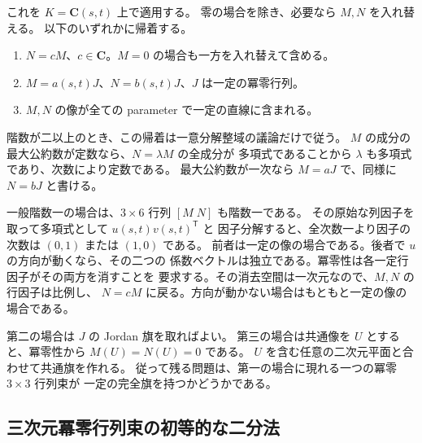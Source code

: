 \documentclass[11pt,a4paper]{ltjsarticle}
\theoremstyle{remark}\newtheorem{remark}[theorem]{注意}
\begin{document}
これを $K=\mathbf C(s,t)$ 上で適用する。
零の場合を除き、必要なら $M,N$ を入れ替える。
以下のいずれかに帰着する。
\begin{enumerate}
\item $N=cM$、$c\in\mathbf C$。$M=0$ の場合も一方を入れ替えて含める。
\item $M=a(s,t)J$、$N=b(s,t)J$、$J$ は一定の冪零行列。
\item $M,N$ の像が全ての parameter で一定の直線に含まれる。
\end{enumerate}
階数が二以上のとき、この帰着は一意分解整域の議論だけで従う。
$M$ の成分の最大公約数が定数なら、$N=\lambda M$ の全成分が
多項式であることから $\lambda$ も多項式であり、次数により定数である。
最大公約数が一次なら $M=aJ$ で、同様に $N=bJ$ と書ける。

一般階数一の場合は、$3\times6$ 行列 $[M\;N]$ も階数一である。
その原始な列因子を取って多項式として $u(s,t)v(s,t)^{\mathsf T}$ と
因子分解すると、全次数一より因子の次数は $(0,1)$ または $(1,0)$ である。
前者は一定の像の場合である。後者で $u$ の方向が動くなら、その二つの
係数ベクトルは独立である。冪零性は各一定行因子がその両方を消すことを
要求する。その消去空間は一次元なので、$M,N$ の行因子は比例し、
$N=cM$ に戻る。方向が動かない場合はもともと一定の像の場合である。

第二の場合は $J$ の Jordan 旗を取ればよい。
第三の場合は共通像を $U$ とすると、冪零性から $M(U)=N(U)=0$ である。
$U$ を含む任意の二次元平面と合わせて共通旗を作れる。
従って残る問題は、第一の場合に現れる一つの冪零 $3\times3$ 行列束が
一定の完全旗を持つかどうかである。

\subsection{三次元冪零行列束の初等的な二分法}
\end{document}
